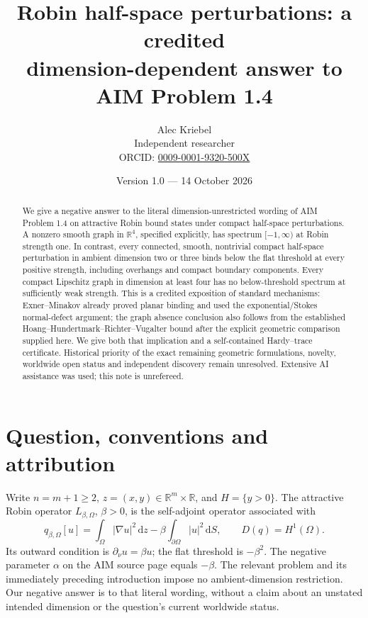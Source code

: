 \documentclass[11pt]{article}
\title{Robin half-space perturbations: a credited\\ dimension-dependent answer to AIM Problem 1.4}
\author{Alec Kriebel\\Independent researcher\\
\small ORCID: \href{https://orcid.org/0009-0001-9320-500X}{0009-0001-9320-500X}}
\date{Version 1.0 --- 14 October 2026}
\newcommand{\R}{\mathbb R}
\newcommand{\dd}{\,\mathrm d}
\begin{document}
\maketitle
\begin{abstract}
We give a negative answer to the literal dimension-unrestricted wording of
AIM Problem 1.4 on attractive Robin bound states under compact half-space
perturbations. A nonzero smooth graph in $\R^4$, specified explicitly, has
spectrum $[-1,\infty)$ at Robin strength one. In contrast, every connected,
smooth, nontrivial compact half-space perturbation in ambient dimension two
or three binds below the flat threshold at every positive strength, including
overhangs and compact boundary components. Every compact Lipschitz graph in
dimension at least four has no below-threshold spectrum at sufficiently weak
strength. This is a credited exposition of standard mechanisms: Exner--Minakov
already proved planar binding and used the exponential/Stokes normal-defect
argument; the graph absence conclusion also follows from the established
Hoang--Hundertmark--Richter--Vugalter bound after the explicit geometric
comparison supplied here. We give both that implication and a self-contained
Hardy--trace certificate. Historical priority of the exact remaining geometric
formulations, novelty, worldwide open status and independent discovery remain
unresolved. Extensive AI assistance was used; this note is unrefereed.
\end{abstract}

\section{Question, conventions and attribution}
Write $n=m+1\ge2$, $z=(x,y)\in\R^m\times\R$, and $H=\{y>0\}$.
The attractive Robin operator $L_{\beta,\Omega}$, $\beta>0$, is the
self-adjoint operator associated with
\begin{equation}\label{form}
 q_{\beta,\Omega}[u]=\int_\Omega|\nabla u|^2\dd z
       -\beta\int_{\partial\Omega}|u|^2\dd S,\qquad D(q)=H^1(\Omega).
\end{equation}
Its outward condition is $\partial_\nu u=\beta u$; the flat threshold is
$-\beta^2$. The negative parameter $\alpha$ on the AIM source page
\cite{AIM} equals $-\beta$. The relevant problem and its immediately preceding
introduction impose no ambient-dimension restriction. Our negative answer is
to that literal wording, without a claim about an unstated intended dimension
or the question's current worldwide status.
\end{document}
